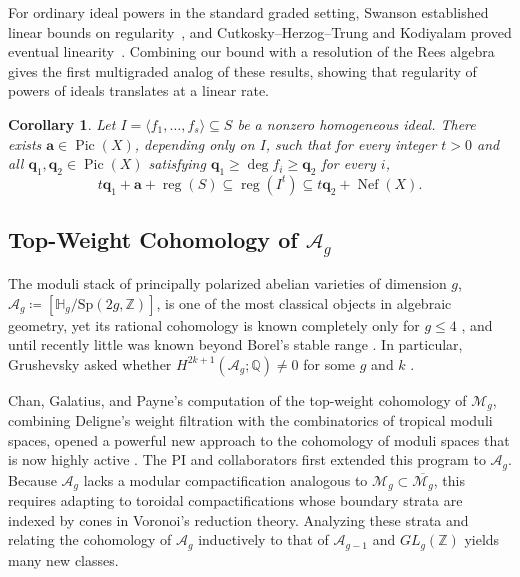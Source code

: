 \documentclass[11pt,reqno]{amsart}
\newtheorem{cor}[lemma]{Corollary}
\theoremstyle{remark}
\newcommand{\reg}{\operatorname{reg}}
\newcommand{\Pic}{\operatorname{Pic}}
\newcommand{\GL}{{GL}}
\newcommand{\Nef}{\operatorname{Nef}}
\renewcommand{\aa}{\mathbf{a}}
\newcommand{\dd}{\mathbf{d}}
\newcommand{\qq}{\mathbf{q}}
\newcommand{\HH}{\mathbb{H}}
\newcommand{\QQ}{\mathbb{Q}}
\newcommand{\ZZ}{\mathbb{Z}}
\newcommand{\cA}{\mathcal{A}}
\newcommand{\cM}{\mathcal{M}}
\begin{document}

For ordinary ideal powers in the standard graded setting, Swanson established linear bounds on regularity~\cite{swanson97}, and Cutkosky--Herzog--Trung and Kodiyalam proved eventual linearity~\cite{CHT99,Kodiyalam00}. Combining our bound with a resolution of the Rees algebra gives the first multigraded analog of these results, showing that regularity of powers of ideals translates at a linear rate.

\begin{cor}\cite[Theorem~5.1]{bruceHellerSayrafi22}
Let $I=\langle f_1,\ldots,f_s\rangle\subseteq S$ be a nonzero homogeneous ideal. There exists $\aa\in\Pic(X)$, depending only on $I$, such that for every integer $t>0$ and all $\qq_1,\qq_2\in\Pic(X)$ satisfying $\qq_1\geq\deg f_i\geq\qq_2$ for every $i$,
\[
t\qq_1+\aa+\reg(S)\subseteq\reg(I^t)\subseteq t\qq_2+\Nef(X).
\]
\end{cor}

\subsection{Top-Weight Cohomology of $\mathcal{A}_{g}$}\label{subsec:prior:cohomology-of-ag}

The moduli stack of principally polarized abelian varieties of dimension $g$, $\cA_g\coloneqq[\HH_g/\mathrm{Sp}(2g, \ZZ)]$, is one of the most classical objects in algebraic geometry, yet its rational cohomology is known completely only for $g\leq 4$ \cite{igusa62,hain02,HT12,HT18}, and until recently little was known beyond Borel's stable range \cite{borel74}. In particular, Grushevsky asked whether $H^{2k+1}(\cA_{g};\QQ)\neq0$ for some $g$ and $k$ \cite{grushevsky09}.

Chan, Galatius, and Payne's computation of the top-weight cohomology of $\cM_g$, combining Deligne's weight filtration with the combinatorics of tropical moduli spaces, opened a powerful new approach to the cohomology of moduli spaces \cite{CGP21} that is now highly active \cite{CGP22,payneWillwacher21,BCGY23,canningLarsonPayne23}. The PI and collaborators first extended this program to $\cA_g$. Because $\cA_g$ lacks a modular compactification analogous to $\cM_g \subset \overline{\cM_g}$, this requires adapting \cite{CGP21} to toroidal compactifications whose boundary strata are indexed by cones in Voronoi's reduction theory. Analyzing these strata and relating the cohomology of $\cA_g$ inductively to that of $\cA_{g-1}$ and $\GL_g(\ZZ)$ yields many new classes.
\end{document}
